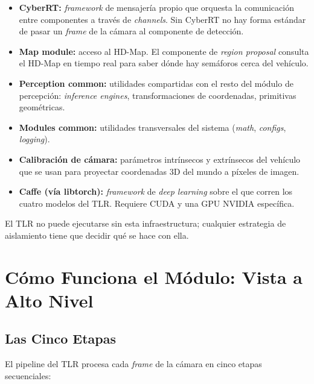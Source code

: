 \begin{itemize}
    \item \textbf{CyberRT:} \textit{framework} de mensajería propio que orquesta la comunicación entre componentes a través de \textit{channels}. Sin CyberRT no hay forma estándar de pasar un \textit{frame} de la cámara al componente de detección.
    \item \textbf{Map module:} acceso al HD-Map. El componente de \textit{region proposal} consulta el HD-Map en tiempo real para saber dónde hay semáforos cerca del vehículo.
    \item \textbf{Perception common:} utilidades compartidas con el resto del módulo de percepción: \textit{inference engines}, transformaciones de coordenadas, primitivas geométricas.
    \item \textbf{Modules common:} utilidades transversales del sistema (\textit{math}, \textit{configs}, \textit{logging}).
    \item \textbf{Calibración de cámara:} parámetros intrínsecos y extrínsecos del vehículo que se usan para proyectar coordenadas 3D del mundo a píxeles de imagen.
    \item \textbf{Caffe (vía libtorch):} \textit{framework} de \textit{deep learning} sobre el que corren los cuatro modelos del TLR. Requiere CUDA y una GPU NVIDIA específica.
\end{itemize}

El TLR no puede ejecutarse sin esta infraestructura; cualquier estrategia de aislamiento tiene que decidir qué se hace con ella.

\section{Cómo Funciona el Módulo: Vista a Alto Nivel}

\subsection{Las Cinco Etapas}

El pipeline del TLR procesa cada \textit{frame} de la cámara en cinco etapas secuenciales:

